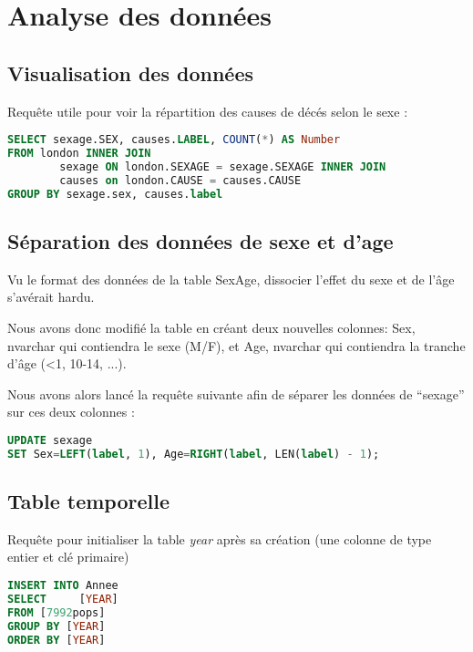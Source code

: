 \chapter{Analyse des données}

\section{Visualisation des données}

    Requête utile pour voir la répartition des causes de décés selon le sexe :

    \begin{lstlisting}[frame=single, language=SQL]
SELECT sexage.SEX, causes.LABEL, COUNT(*) AS Number
FROM london INNER JOIN
        sexage ON london.SEXAGE = sexage.SEXAGE INNER JOIN
        causes on london.CAUSE = causes.CAUSE
GROUP BY sexage.sex, causes.label
    \end{lstlisting}

\section{Séparation des données de sexe et d'age}

    Vu le format des données de la table SexAge, dissocier l'effet du sexe et de l'âge s'avérait hardu.

    Nous avons donc modifié la table en créant deux nouvelles colonnes: Sex, nvarchar qui contiendra le sexe (M/F), et Age,
    nvarchar qui contiendra la tranche d'âge (<1, 10-14, ...).

    Nous avons alors lancé la requête suivante afin de séparer les données de ``sexage'' sur ces deux colonnes :

    \begin{lstlisting}[frame=single, language=SQL]
UPDATE sexage
SET Sex=LEFT(label, 1), Age=RIGHT(label, LEN(label) - 1);
    \end{lstlisting}

\section{Table temporelle}

    Requête pour initialiser la table \textit{year} après sa création (une colonne de type entier et clé primaire)

    \begin{lstlisting}[frame=single, language=SQL]
INSERT INTO Annee
SELECT     [YEAR]
FROM [7992pops]
GROUP BY [YEAR]
ORDER BY [YEAR]
    \end{lstlisting}

